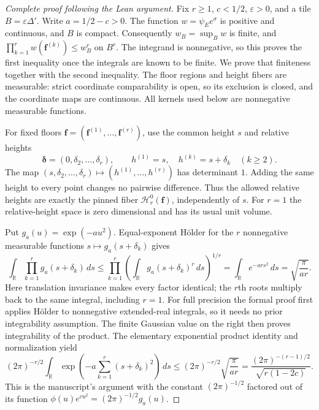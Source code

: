 \begin{proof}[Complete proof following the Lean argument]
Fix \(r\ge1\), \(c<1/2\), \(\varepsilon>0\), and a tile
\(B=\varepsilon\Delta'\). Write \(a=1/2-c>0\). The function
\(w=\psi_E e^\sigma\) is positive and continuous, and \(B\) is compact.
Consequently \(w_B=\sup_Bw\) is finite, and
\(\prod_{k=1}^r w(\mathbf f^{(k)})\le w_B^r\) on \(B^r\).
The integrand is nonnegative, so this proves the first inequality once
the integrals are known to be finite. We prove that finiteness together
with the second inequality.
The floor regions and height fibers are measurable: strict coordinate
comparability is open, so its exclusion is closed, and the coordinate
maps are continuous. All kernels used below are nonnegative measurable
functions.

For fixed floors \(\mathbf f=(\mathbf f^{(1)},\ldots,\mathbf f^{(r)})\),
use the common height \(s\) and relative heights
\[
 \boldsymbol\delta=(0,\delta_2,\ldots,\delta_r),\qquad
 h^{(1)}=s,\quad h^{(k)}=s+\delta_k\quad (k\ge2).
\]
The map \((s,\delta_2,\ldots,\delta_r)\mapsto(h^{(1)},\ldots,h^{(r)})\)
has determinant \(1\). Adding the same height to every point changes
no pairwise difference. Thus the allowed relative heights are exactly
the pinned fiber \(\mathcal H_r^0(\mathbf f)\), independently of \(s\).
For \(r=1\) the relative-height space is zero dimensional and has
its usual unit volume.

Put \(g_a(u)=\exp(-au^2)\). Equal-exponent H\"older for the \(r\)
nonnegative measurable functions \(s\mapsto g_a(s+\delta_k)\) gives
\[
 \int_{\mathbb R}\prod_{k=1}^r g_a(s+\delta_k)\,ds
 \le \prod_{k=1}^r\left(\int_{\mathbb R}g_a(s+\delta_k)^r\,ds\right)^{1/r}
 =\int_{\mathbb R}e^{-ar s^2}\,ds
 =\sqrt{\frac\pi{ar}}.
\]
Here translation invariance makes every factor identical; the \(r\)th roots
multiply back to the same integral, including \(r=1\).
For full precision the formal proof first applies H\"older to nonnegative
extended-real integrals, so it needs no prior integrability assumption.
The finite Gaussian value on the right then proves integrability of the
product. The elementary exponential product identity and normalization yield
\[
 (2\pi)^{-r/2}\int_{\mathbb R}
     \exp\!\left(-a\sum_{k=1}^r(s+\delta_k)^2\right)\,ds
 \le (2\pi)^{-r/2}\sqrt{\frac\pi{ar}}
 =\frac{(2\pi)^{-(r-1)/2}}{\sqrt{r(1-2c)}}.
\]
This is the manuscript's argument with the constant
\((2\pi)^{-1/2}\) factored out of its function
\(\phi(u)e^{cu^2}=(2\pi)^{-1/2}g_a(u)\).


\end{proof}
